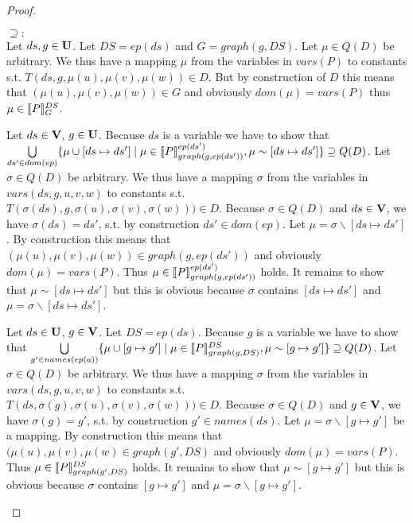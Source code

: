\begin{proof}
\begin{enumerate}
			\bigskip\noindent$\supseteq:$\\
			Let $ds,g \in \mathbf{U}$. Let $DS = ep(ds)$ and $G = graph(g,DS)$.
			Let $\mu \in Q(D)$ be arbitrary.
			We thus have a mapping $\mu$ from the variables in $vars(P)$ to constants s.t.
			$T(ds,g,\mu(u),\mu(v),\mu(w)) \in D$. 
			But by construction of $D$ this means that
			$(\mu(u),\mu(v),\mu(w)) \in G$ 
			and obviously $dom(\mu) = vars(P)$ thus $\mu \in \llbracket P
			\rrbracket^{DS}_{G}$. 

			\bigskip\noindent
			Let $ds \in \mathbf{V}$, $g \in \mathbf{U}$.
			Because $ds$ is a variable we have to show that 
			$\bigcup\limits_{ds' \in dom(ep)} \{ \mu \cup [ds \mapsto ds'] \mid \mu \in \llbracket P
			\rrbracket^{ep(ds')}_{graph(g,ep(ds'))},\mu \sim [ds \mapsto ds']\} \supseteq Q(D)$.
			Let $\sigma \in Q(D)$ be arbitrary.
			We thus have a mapping $\sigma$ from the 
			variables in $vars(ds,g,u,v,w)$ to constants s.t.\\
			$T(\sigma(ds),g,\sigma(u),\sigma(v),\sigma(w)))
			\in D$. Because $\sigma \in Q(D)$ and $ds \in \mathbf{V}$, we have
			$\sigma(ds) = ds'$, s.t. by construction $ds' \in dom(ep)$. 
			Let $\mu = \sigma\backslash[ds\mapsto ds']$. 
			By construction this means that
			$(\mu(u),\mu(v),\mu(w)) \in graph(g,ep(ds'))$ and obviously
			$dom(\mu) = vars(P)$. Thus $\mu \in \llbracket
			P\rrbracket^{ep(ds')}_{graph(g,ep(ds'))}$ holds. 
			It remains to show that
			$\mu \sim [ds \mapsto ds']$
			but this is obvious because $\sigma$ contains $[ds \mapsto ds']$ and $\mu = \sigma
			\backslash [ds \mapsto ds']$. 

			\bigskip\noindent
			Let $ds \in \mathbf{U}$, $g \in \mathbf{V}$. Let $DS = ep(ds)$.
			Because $g$ is a variable we have to show that 
			$\bigcup\limits_{g' \in names(ep(a))} \{ \mu \cup [g \mapsto g'] \mid \mu \in \llbracket P
			\rrbracket^{DS}_{graph(g,DS)},\mu \sim [g \mapsto g']\} \supseteq Q(D)$.
			Let $\sigma \in Q(D)$ be arbitrary.
			We thus have a mapping $\sigma$ from the variables in
			$vars(ds,g,u,v,w)$ to constants s.t.\\
			$T(ds,\sigma(g),\sigma(u),\sigma(v),\sigma(w))) \in D$.
			Because $\sigma \in Q(D)$ and $g \in \mathbf{V}$, we have
			$\sigma(g) = g'$, s.t. by construction $g' \in names(ds)$. Let $\mu =
			\sigma\backslash[g\mapsto g']$ be a mapping. By construction 
			this means that	$(\mu(u),\mu(v),\mu(w) \in graph(g',DS)$ 
			and obviously $dom(\mu) = vars(P)$. Thus $\mu \in \llbracket P
			\rrbracket^{DS}_{graph(g',DS)}$ holds. It remains to show that $\mu \sim [g \mapsto g']$
			but this is obvious because $\sigma$ contains $[g \mapsto g']$ and $\mu = \sigma
			\backslash [g \mapsto g']$.


\end{enumerate}
\end{proof}
